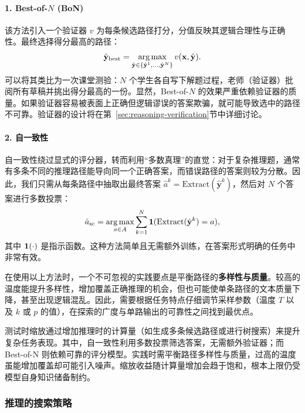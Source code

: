 \paragraph{1. Best-of-$N$ (BoN)}
该方法引入一个验证器 $v$ 为每条候选路径打分，分值反映其逻辑合理性与正确性。最终选择得分最高的路径：
\begin{eqnarray}
\hat{\mathbf{y}}_{\mathrm{best}} = \argmax_{\hat{\mathbf{y}} \in \{\hat{\mathbf{y}}^1, \dots, \hat{\mathbf{y}}^N\}} v(\mathbf{x}, \hat{\mathbf{y}}).
\end{eqnarray}
可以将其类比为一次课堂测验：$N$ 个学生各自写下解题过程，老师（验证器）批阅所有草稿并挑出得分最高的一份。显然，Best-of-$N$ 的效果严重依赖验证器的质量。如果验证器容易被表面上正确但逻辑谬误的答案欺骗，就可能导致选中的路径不可靠。验证器的设计将在第~\ref{sec:reasoning-verification}节中详细讨论。

\paragraph{2. 自一致性}
自一致性绕过显式的评分器，转而利用“多数真理”的直觉：对于复杂推理题，通常有多条不同的推理路径能导向同一个正确答案，而错误路径的答案则较为分散。因此，我们只需从每条路径中抽取出最终答案 $\hat{a}^k = \mathrm{Extract}(\hat{\mathbf{y}}^k)$，然后对 $N$ 个答案进行多数投票：
\begin{eqnarray}
\hat{a}_{\mathrm{sc}} = \argmax_{a \in A} \sum_{k=1}^N \mathbbm{1}(\mathrm{Extract}(\hat{\mathbf{y}}^k) = a),
\end{eqnarray}
其中 $\mathbbm{1}(\cdot)$ 是指示函数。这种方法简单且无需额外训练，在答案形式明确的任务中非常有效。

在使用以上方法时，一个不可忽视的实践要点是平衡路径的\textbf{多样性与质量}。较高的温度能提升多样性，增加覆盖正确推理的机会，但也可能使单条路径的文本质量下降，甚至出现逻辑混乱。因此，需要根据任务特点仔细调节采样参数（温度 $T$ 以及 $k$ 或 $p$ 的值），在探索的广度与单路输出的可靠性之间找到最优点。

\begin{importantnote}
测试时缩放通过增加推理时的计算量（如生成多条候选路径或进行树搜索）来提升复杂任务表现。其中，自一致性利用多数投票筛选答案，无需额外验证器；而 Best-of-N 则依赖可靠的评分模型。实践时需平衡路径多样性与质量，过高的温度虽能增加覆盖却可能引入噪声。缩放收益随计算量增加会趋于饱和，根本上限仍受模型自身知识储备制约。
\end{importantnote}

\subsubsection{推理的搜索策略}
\label{sec:search-strategies-for-reasoning}

